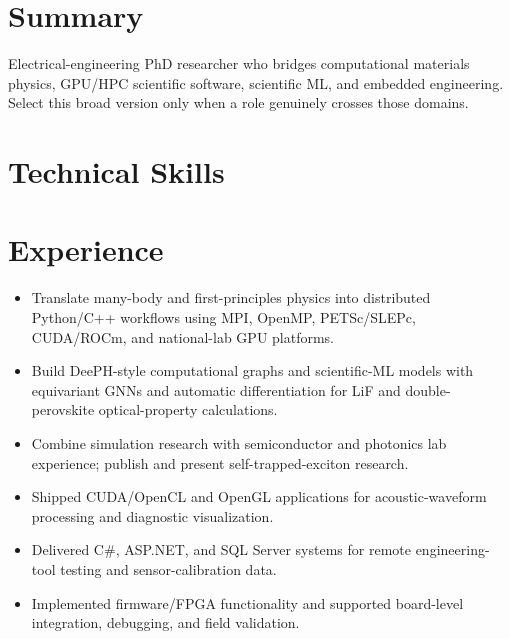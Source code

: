 \section{Summary}
Electrical-engineering PhD researcher who bridges computational materials physics, GPU/HPC scientific software, scientific ML, and embedded engineering. Select this broad version only when a role genuinely crosses those domains.
\section{Technical Skills}
\section{Experience}
\begin{itemize}
\item Translate many-body and first-principles physics into distributed Python/C++ workflows using MPI, OpenMP, PETSc/SLEPc, CUDA/ROCm, and national-lab GPU platforms.
\item Build DeePH-style computational graphs and scientific-ML models with equivariant GNNs and automatic differentiation for LiF and double-perovskite optical-property calculations.
\item Combine simulation research with semiconductor and photonics lab experience; publish and present self-trapped-exciton research.
\end{itemize}
\begin{itemize}
\item Shipped CUDA/OpenCL and OpenGL applications for acoustic-waveform processing and diagnostic visualization.
\item Delivered C\#, ASP.NET, and SQL Server systems for remote engineering-tool testing and sensor-calibration data.
\item Implemented firmware/FPGA functionality and supported board-level integration, debugging, and field validation.
\end{itemize}
